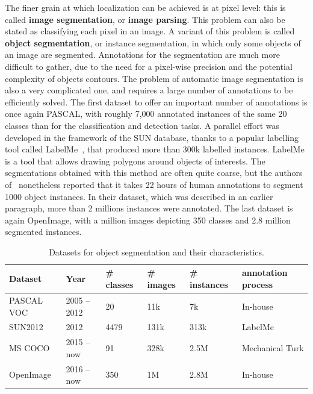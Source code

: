 The finer grain at which localization can be achieved is at pixel level:
this is called \textbf{image segmentation}, or \textbf{image parsing}.
This problem can also be stated as classifying each pixel in an image.
A variant of this problem is called \textbf{object segmentation},
or instance segmentation, in which only some objects of an image are segmented.
Annotations for the segmentation are much more difficult to gather,
due to the need for a pixel-wise precision
and the potential complexity of objects contours.
The problem of automatic image segmentation is also a very complicated one,
and requires a large number of annotations to be efficiently solved.
The first dataset to offer an important number of annotations is once again PASCAL,
with roughly 7,000 annotated instances of the same 20 classes
than for the classification and detection tasks.
A parallel effort was developed in the framework of the SUN database,
thanks to a popular labelling tool called LabelMe~\cite{russell2008labelme},
that produced more than 300k labelled instances.
LabelMe is a tool that allows drawing polygons around objects of interests.
The segmentations obtained with this method are often quite coarse,
but the authors of~\cite{lin2014microsoft} nonetheless reported that
it takes 22 hours of human annotations to segment 1000 object instances.
In their dataset, which was described in an earlier paragraph,
more than 2 millions instances were annotated.
The last dataset is again OpenImage, with a million images depicting 350 classes
and 2.8 million segmented instances.

\begin{table}
\centering
\caption{Datasets for object segmentation and their characteristics.}
\begin{tabular}{llllll}
	Dataset & Year & \# classes & \# images & \# instances & annotation process \\
	\midrule
	PASCAL VOC \cite{Everingham10} & 2005 -- 2012 & 20 & 11k & 7k & In-house \\
	SUN2012 \cite{xiao2010sun} & 2012 & 4479 & 131k & 313k & LabelMe \cite{russell2008labelme,barriuso2012notes} \\
	MS COCO \cite{lin2014microsoft} & 2015 -- now & 91 & 328k & 2.5M & Mechanical Turk \\
	OpenImage \cite{OpenImages, OpenImages2} & 2016 -- now & 350 & 1M & 2.8M & In-house \\
\end{tabular}%
\label{tab:segmentation_ds}
\end{table}


